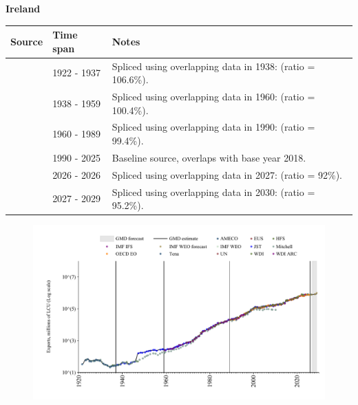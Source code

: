 \documentclass[12pt,a4paper,landscape]{article}
\begin{document}
\begin{adjustbox}{max totalsize={\paperwidth}{\paperheight},center}
\begin{minipage}[t][\textheight][t]{\textwidth}
\vspace*{0.5cm}
{}
\begin{center}
{\Large\bfseries Ireland}
\end{center}
\vspace{0.5cm}
\begin{table}[H]
\centering
\small
\begin{tabular}{|l|l|l|}
\hline
\textbf{Source} & \textbf{Time span} & \textbf{Notes} \\
\hline
\rowcolor{white}\cite{Tena}& 1922 - 1937 &Spliced using overlapping data in 1938: (ratio = 106.6\%).\\
\rowcolor{lightgray}\cite{JST}& 1938 - 1959 &Spliced using overlapping data in 1960: (ratio = 100.4\%).\\
\rowcolor{white}\cite{AMECO}& 1960 - 1989 &Spliced using overlapping data in 1990: (ratio = 99.4\%).\\
\rowcolor{lightgray}\cite{OECD_EO}& 1990 - 2025 &Baseline source, overlaps with base year 2018.\\
\rowcolor{white}\cite{AMECO}& 2026 - 2026 &Spliced using overlapping data in 2027: (ratio = 92\%).\\
\rowcolor{lightgray}\cite{IMF_WEO_forecast}& 2027 - 2029 &Spliced using overlapping data in 2030: (ratio = 95.2\%).\\
\hline
\end{tabular}
\end{table}
\begin{figure}[H]
\centering
\includegraphics[width=\textwidth,height=0.6\textheight,keepaspectratio]{graphs/IRL_exports.pdf}
\end{figure}
\end{minipage}
\end{adjustbox}
\end{document}
